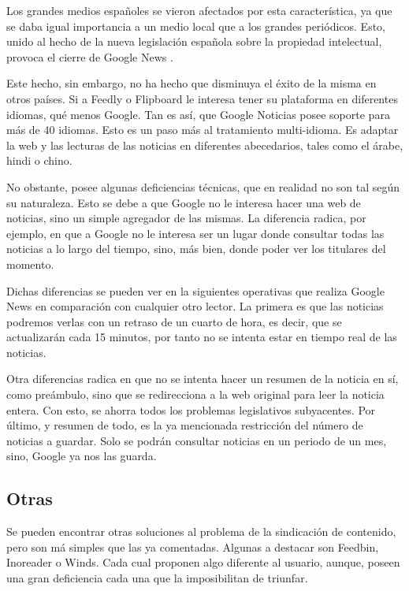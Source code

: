 Los grandes medios españoles se vieron afectados por esta característica, ya que se daba igual importancia a un medio local que a los grandes periódicos. Esto, unido al hecho de la nueva legislación española sobre la propiedad intelectual, provoca el cierre de Google News .


Este hecho, sin embargo, no ha hecho que disminuya el éxito de la misma en otros países. Si a Feedly o Flipboard le interesa tener su plataforma en diferentes idiomas, qué menos Google. Tan es así, que Google Noticias posee soporte para más de 40 idiomas. Esto es un paso más al tratamiento multi-idioma. Es adaptar la web y las lecturas de las noticias en diferentes abecedarios, tales como el árabe, hindi o chino.

No obstante, posee algunas deficiencias técnicas, que en realidad no son tal según su naturaleza. Esto se debe a que Google no le interesa hacer una web de noticias, sino un simple agregador de las mismas. La diferencia radica, por ejemplo, en que a Google no le interesa ser un lugar donde consultar todas las noticias a lo largo del tiempo, sino, más bien, donde poder ver los titulares del momento.

Dichas diferencias se pueden ver en la siguientes operativas que realiza Google News en comparación con cualquier otro lector. La primera es que las noticias podremos verlas con un retraso de un cuarto de hora, es decir, que se actualizarán cada 15 minutos, por tanto no se intenta estar en tiempo real de las noticias.

Otra diferencias radica en que no se intenta hacer un resumen de la noticia en sí, como preámbulo, sino que se redirecciona a la web original para leer la noticia entera. Con esto, se ahorra todos los problemas legislativos subyacentes. Por último, y resumen de todo, es la ya mencionada restricción del número de noticias a guardar. Solo se podrán consultar noticias en un periodo de un mes, sino, Google ya nos las guarda.

\subsection{Otras}

Se pueden encontrar otras soluciones al problema de la sindicación de contenido, pero son má simples que las ya comentadas. Algunas a destacar son Feedbin, Inoreader o Winds. Cada cual proponen algo diferente al usuario, aunque, poseen una gran deficiencia cada una que la imposibilitan de triunfar.

